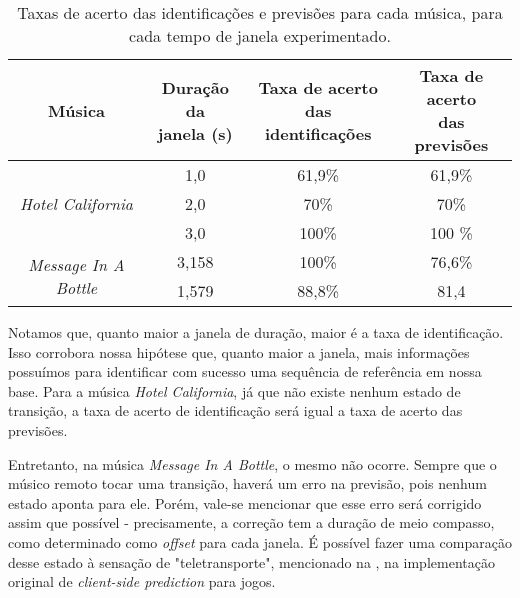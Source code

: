 \begin{table}[ht!]
    \centering
    \begin{tabular}{|c|c|c|c|}
        \hline
        Música & \makecell{Duração da \\ janela (s)} & \makecell{Taxa de acerto \\ das identificações} & \makecell{Taxa de acerto \\ das previsões}\\
        
        \hline
        \hline
        
        \multirow{3}{5em}{\centering \textit{Hotel California}} & 1,0 & 61,9\% & 61,9\% \\ 
        \cline{2-4}
        
        & 2,0 & 70\% & 70\% \\ 
        \cline{2-4}
        
        & 3,0 & 100\% & 100 \% \\ 
        
        \hline
        
        \multirow{2}{5em}{\centering \textit{Message In A Bottle}} & 3,158 & 100\% & 76,6\% \\ 
        \cline{2-4}
        
        & 1,579 & 88,8\% & 81,4 \\ 
        \cline{2-4}
        
        \hline
    \end{tabular}
    \caption{Taxas de acerto das identificações e previsões para cada música, para cada tempo de janela experimentado.}
    \label{tab:dtw_results_correctness}
\end{table}

Notamos que, quanto maior a janela de duração, maior é a taxa de identificação. Isso corrobora nossa hipótese que, quanto maior a janela, mais informações possuímos para identificar com sucesso uma sequência de referência em nossa base. Para a música \textit{Hotel California}, já que não existe nenhum estado de transição, a taxa de acerto de identificação será igual a taxa de acerto das previsões.

Entretanto, na música \textit{Message In A Bottle}, o mesmo não ocorre. Sempre que o músico remoto tocar uma transição, haverá um erro na previsão, pois nenhum estado aponta para ele. Porém, vale-se mencionar que esse erro será corrigido assim que possível - precisamente, a correção tem a duração de meio compasso, como determinado como \textit{offset} para cada janela. É possível fazer uma comparação desse estado à sensação de "teletransporte", mencionado na , na implementação original de \textit{client-side prediction} para jogos.

